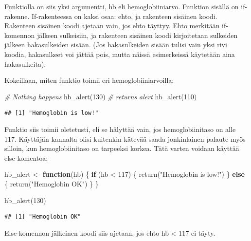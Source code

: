 \documentclass[
]{book}
\newenvironment{Shaded}{\begin{snugshade}}{\end{snugshade}}
\newcommand{\CommentTok}[1]{\textcolor[rgb]{0.56,0.35,0.01}{\textit{#1}}}
\newcommand{\ControlFlowTok}[1]{\textcolor[rgb]{0.13,0.29,0.53}{\textbf{#1}}}
\newcommand{\DecValTok}[1]{\textcolor[rgb]{0.00,0.00,0.81}{#1}}
\newcommand{\FunctionTok}[1]{\textcolor[rgb]{0.00,0.00,0.00}{#1}}
\newcommand{\NormalTok}[1]{#1}
\newcommand{\OtherTok}[1]{\textcolor[rgb]{0.56,0.35,0.01}{#1}}
\newcommand{\SpecialCharTok}[1]{\textcolor[rgb]{0.00,0.00,0.00}{#1}}
\newcommand{\StringTok}[1]{\textcolor[rgb]{0.31,0.60,0.02}{#1}}
\begin{document}
Funktiolla on siis yksi argumentti, hb eli hemoglobiiniarvo. Funktion sisällä on if-rakenne. If-rakenteessa on kaksi osaa: ehto, ja rakenteen sisäinen koodi. Rakenteen sisäinen koodi ajetaan vain, jos ehto täyttyy. Ehto merkitään if-komennon jälkeen sulkeisiin, ja rakenteen sisäinen koodi kirjoitetaan sulkeiden jälkeen hakasulkeiden sisään. (Jos hakasulkeiden sisään tulisi vain yksi rivi koodia, hakasulkeet voi jättää pois, mutta näissä esimerkeissä käytetään aina hakasulkeita).

Kokeillaan, miten funktio toimii eri hemoglobiiniarvoilla:

\begin{Shaded}
\begin{Highlighting}[]
\CommentTok{\# Nothing happens}
\FunctionTok{hb\_alert}\NormalTok{(}\DecValTok{130}\NormalTok{)}
\CommentTok{\# returns alert}
\FunctionTok{hb\_alert}\NormalTok{(}\DecValTok{110}\NormalTok{)}
\end{Highlighting}
\end{Shaded}

\begin{verbatim}
## [1] "Hemoglobin is low!"
\end{verbatim}

Funktio siis toimii oletetusti, eli se hälyttää vain, jos hemoglobiinitaso on alle 117. Käyttäjän kannalta olisi kuitenkin kätevää saada jonkinlainen palaute myös silloin, kun hemoglobiinitaso on tarpeeksi korkea. Tätä varten voidaan käyttää else-komentoa:

\begin{Shaded}
\begin{Highlighting}[]
\NormalTok{hb\_alert }\OtherTok{\textless{}{-}} \ControlFlowTok{function}\NormalTok{(hb) \{}
  \ControlFlowTok{if}\NormalTok{ (hb }\SpecialCharTok{\textless{}} \DecValTok{117}\NormalTok{) \{}
    \FunctionTok{return}\NormalTok{(}\StringTok{"Hemoglobin is low!"}\NormalTok{)}
\NormalTok{  \} }\ControlFlowTok{else}\NormalTok{ \{}
    \FunctionTok{return}\NormalTok{(}\StringTok{"Hemoglobin OK"}\NormalTok{)}
\NormalTok{  \}}
\NormalTok{\}}

\FunctionTok{hb\_alert}\NormalTok{(}\DecValTok{130}\NormalTok{)}
\end{Highlighting}
\end{Shaded}

\begin{verbatim}
## [1] "Hemoglobin OK"
\end{verbatim}

Else-komennon jälkeinen koodi siis ajetaan, jos ehto hb \textless{} 117 ei täyty.
\end{document}
